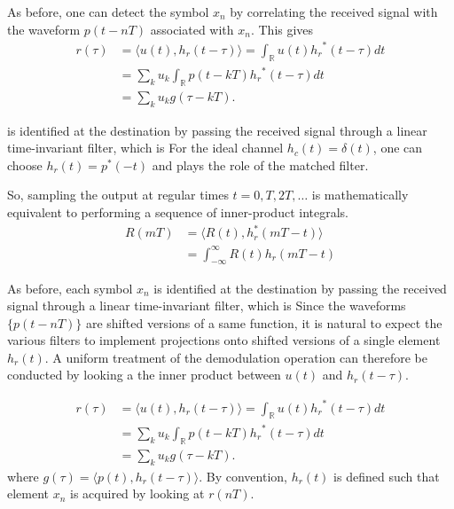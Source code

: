 As before, one can detect the symbol $x_n$  by correlating the received signal with the waveform $p(t-nT)$ associated with $x_n$.
This gives
\begin{equation} \label{equation:InnerProductReceiver}
\begin{split}
r(\tau) &= \langle u(t), h_r (t-\tau) \rangle
= \int_{\mathbb{R}} u(t) {h_r}^*(t-\tau) dt \\
&= \sum_{k} u_k \int_{\mathbb{R}} p(t - kT) {h_r}^*(t-\tau) dt \\
&= \sum_{k} u_k g(\tau - kT) .
\end{split}
\end{equation}

is identified at the destination by passing the received signal through a linear time-invariant filter, which is 
For the ideal channel $h_c(t) = \delta(t)$, one can choose $h_r (t) = p^* (-t)$
 and plays the role of the matched filter.

So, sampling the output at regular times $t=0,T,2T,\ldots$ is mathematically equivalent to performing a sequence of inner-product integrals.
\begin{align*}
R(mT)
&= \langle R(t), h_{r}^* (mT-t) \rangle \\
&= \int_{-\infty}^{\infty} R(t) h_{r} (mT-t)
\end{align*}

As before, each symbol $x_n$ is identified at the destination by passing the received signal through a linear time-invariant filter, which is 
Since the waveforms $\{ p(t-nT) \}$ are shifted versions of a same function, it is natural to expect the various filters to implement projections onto shifted versions of a single element $h_r (t)$.
A uniform treatment of the demodulation operation can therefore be conducted by looking a the inner product between $u(t)$ and $h_r (t-\tau)$.

\begin{equation} \label{equation:InnerProductReceiver}
\begin{split}
r(\tau) &= \langle u(t), h_r (t-\tau) \rangle
= \int_{\mathbb{R}} u(t) {h_r}^*(t-\tau) dt \\
&= \sum_{k} u_k \int_{\mathbb{R}} p(t - kT) {h_r}^*(t-\tau) dt \\
&= \sum_{k} u_k g(\tau - kT) .
\end{split}
\end{equation}
where $g(\tau) = \langle p(t), h_r (t-\tau) \rangle$.
By convention, $h_r (t)$ is defined such that element $x_n$ is acquired by looking at $r(nT)$.
\fi

